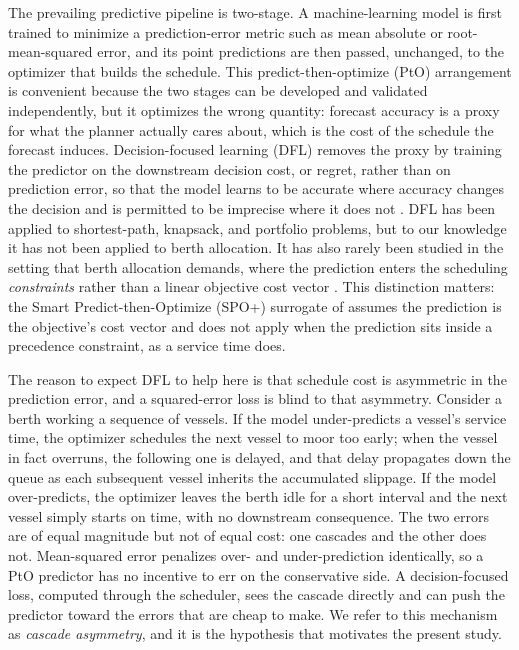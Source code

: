 The prevailing predictive pipeline is two-stage. A machine-learning model is
first trained to minimize a prediction-error metric such as mean absolute or
root-mean-squared error, and its point predictions are then passed, unchanged,
to the optimizer that builds the schedule. This predict-then-optimize (PtO)
arrangement is convenient because the two stages can be developed and validated
independently, but it optimizes the wrong quantity: forecast accuracy is a
proxy for what the planner actually cares about, which is the cost of the
schedule the forecast induces. Decision-focused learning (DFL) removes the
proxy by training the predictor on the downstream decision cost, or regret,
rather than on prediction error, so that the model learns to be accurate where
accuracy changes the decision and is permitted to be imprecise where it does
not \citep{elmachtoub2022spo,mandi2024decision}. DFL has been applied to
shortest-path, knapsack, and portfolio problems, but to our knowledge it has not
been applied to berth allocation. It has also rarely been studied in the
setting that berth allocation demands, where the prediction enters the
scheduling \emph{constraints} rather than a linear objective cost vector
\citep{hu2023twostage,mandi2025feasibility}. This distinction matters: the
Smart Predict-then-Optimize (SPO+) surrogate of \citet{elmachtoub2022spo}
assumes the prediction is the objective's cost vector and does not apply when
the prediction sits inside a precedence constraint, as a service time does.

The reason to expect DFL to help here is that schedule cost is asymmetric in the
prediction error, and a squared-error loss is blind to that asymmetry. Consider
a berth working a sequence of vessels. If the model under-predicts a vessel's
service time, the optimizer schedules the next vessel to moor too early; when
the vessel in fact overruns, the following one is delayed, and that delay
propagates down the queue as each subsequent vessel inherits the accumulated
slippage. If the model over-predicts, the optimizer leaves the berth idle for a
short interval and the next vessel simply starts on time, with no downstream
consequence. The two errors are of equal magnitude but not of equal cost: one
cascades and the other does not. Mean-squared error penalizes over- and
under-prediction identically, so a PtO predictor has no incentive to err on the
conservative side. A decision-focused loss, computed through the scheduler, sees
the cascade directly and can push the predictor toward the errors that are cheap
to make. We refer to this mechanism as \emph{cascade asymmetry}, and it is the
hypothesis that motivates the present study.

